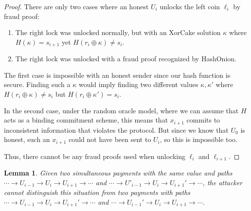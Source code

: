 \documentclass[USenglish,oneside,twocolumn]{article}
\newtheorem{lemma}[theorem]{Lemma}
\begin{document}
\begin{proof}
    There are only two cases where an honest $U_i$ unlocks the left coin $\ell_i$ by fraud proof:
    \begin{enumerate}
        \item The right lock was unlocked normally, but with an XorCake solution $\kappa$ where $H(\kappa) = s_{i+1}$ yet $H(r_i \oplus \kappa) \neq s_i$.
        \item The right lock was unlocked with a fraud proof recognized by HashOnion.
    \end{enumerate}

    The first case is impossible with an honest sender since our hash function is secure. Finding such a $\kappa$ would imply finding two different values $\kappa,\kappa'$ where $H(r_i \oplus \kappa) \neq s_i$ but $H(r_i \oplus \kappa') = s_i$.

    In the second case, under the random oracle model, where we can assume that $H$ acts as a binding commitment scheme, this means that $x_{i+1}$ commits to inconsistent information that violates the protocol. But since we know that $U_0$ is honest, such an $x_{i+1}$ could not have been sent to $U_i$, so this is impossible too.

    Thus, there cannot be any fraud proofs used when unlocking $\ell_i$ and $\ell_{i+1}$.
\end{proof}

\begin{lemma}\label{lem:confuse}
    Given two simultaneous payments with the same value and paths $\cdots \rightarrow U_{i-1} \rightarrow U_i \rightarrow U_{i+1} \rightarrow \cdots $ and $\cdots \rightarrow U'_{i-1} \rightarrow U_i \rightarrow U_{i+1}' \rightarrow \cdots$, the attacker cannot distinguish this situation from two payments with paths $\cdots \rightarrow U_{i-1} \rightarrow U_i \rightarrow U_{i+1}' \rightarrow \cdots$ and $\cdots \rightarrow U_{i-1}' \rightarrow U_i \rightarrow U_{i+1} \rightarrow \cdots $.
\end{lemma}
\end{document}
